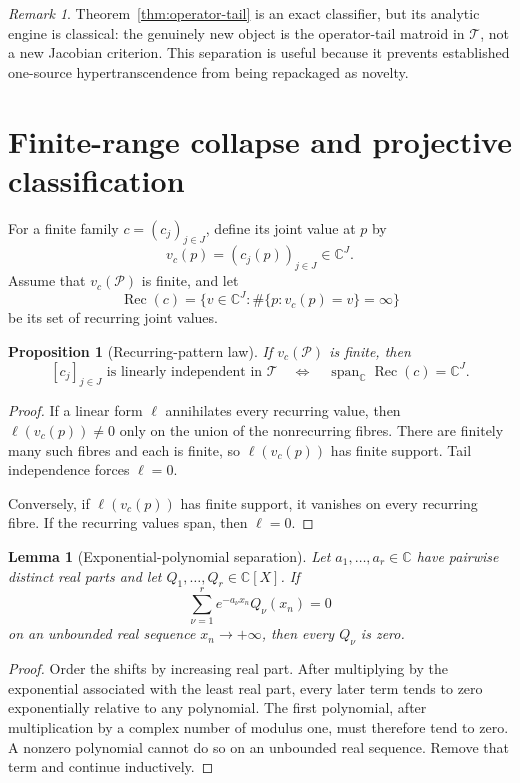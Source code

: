 \documentclass[11pt]{article}
\newtheorem{proposition}[theorem]{Proposition}
\newtheorem{lemma}[theorem]{Lemma}
\theoremstyle{definition}
\theoremstyle{remark}
\newtheorem{remark}[theorem]{Remark}
\newcommand{\C}{\mathbb C}
\newcommand{\cP}{\mathcal P}
\newcommand{\cT}{\mathcal T}
\newcommand{\Span}{\operatorname{span}}
\begin{document}
\begin{remark}
Theorem~\ref{thm:operator-tail} is an exact classifier, but its analytic engine is classical:
the genuinely new object is the operator-tail matroid in \(\cT\), not a new Jacobian
criterion.  This separation is useful because it prevents established one-source
hypertranscendence from being repackaged as novelty.
\end{remark}

\section{Finite-range collapse and projective classification}

For a finite family \(c=(c_j)_{j\in J}\), define its joint value at \(p\) by
\[
  v_c(p)=(c_j(p))_{j\in J}\in\C^J.
\]
Assume that \(v_c(\cP)\) is finite, and let
\[
  \operatorname{Rec}(c)
  =
  \{v\in\C^J:\#\{p:v_c(p)=v\}=\infty\}
\]
be its set of recurring joint values.

\begin{proposition}[Recurring-pattern law]\label{prop:recurring-pattern}
If \(v_c(\cP)\) is finite, then
\[
  [c_j]_{j\in J}\text{ is linearly independent in }\cT
  \quad\Longleftrightarrow\quad
  \Span_\C\operatorname{Rec}(c)=\C^J.
\]
\end{proposition}

\begin{proof}
If a linear form \(\ell\) annihilates every recurring value, then
\(\ell(v_c(p))\neq0\) only on the union of the nonrecurring fibres.  There are finitely
many such fibres and each is finite, so \(\ell(v_c(p))\) has finite support.  Tail
independence forces \(\ell=0\).

Conversely, if \(\ell(v_c(p))\) has finite support, it vanishes on every recurring fibre.
If the recurring values span, then \(\ell=0\).
\end{proof}

\begin{lemma}[Exponential-polynomial separation]\label{lem:exp-poly}
Let \(a_1,\ldots,a_r\in\C\) have pairwise distinct real parts and let
\(Q_1,\ldots,Q_r\in\C[X]\).  If
\[
  \sum_{\nu=1}^r e^{-a_\nu x_n}Q_\nu(x_n)=0
\]
on an unbounded real sequence \(x_n\to+\infty\), then every \(Q_\nu\) is zero.
\end{lemma}

\begin{proof}
Order the shifts by increasing real part.  After multiplying by the exponential associated
with the least real part, every later term tends to zero exponentially relative to any
polynomial.  The first polynomial, after multiplication by a complex number of modulus one,
must therefore tend to zero.  A nonzero polynomial cannot do so on an unbounded real sequence.
Remove that term and continue inductively.
\end{proof}
\end{document}
